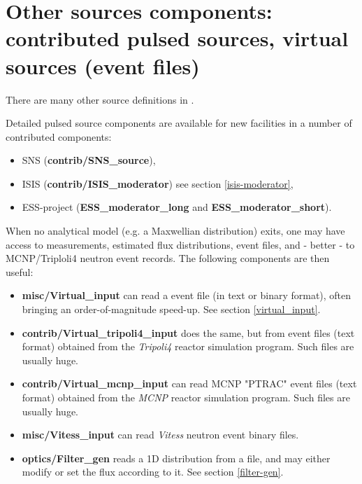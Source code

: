 





\newpage




\newpage




\newpage




\newpage
\section{Other sources components: contributed pulsed sources, virtual sources (event files)}
\label{sources-seealso}

There are many other source definitions in \MCS .

Detailed pulsed source components are available for new facilities
in a number of contributed components:
\begin{itemize}
\item SNS (\textbf{contrib/SNS\_source}),
\item ISIS (\textbf{contrib/ISIS\_moderator}) see section \ref{isis-moderator},
\item ESS-project (\textbf{ESS\_moderator\_long} and \textbf{ ESS\_moderator\_short}).
\end{itemize}

When no analytical model (e.g. a Maxwellian distribution) exits,
one may have access to measurements, estimated flux distributions,
event files, and - better - to MCNP/Triploli4 neutron event records.
The following components are then useful:

\begin{itemize}
\item{\textbf{misc/Virtual\_input} can read a \MCS event file
(in text or binary format), often bringing an order-of-magnitude speed-up.
See section \ref{virtual_input}.}
\item{\textbf{contrib/Virtual\_tripoli4\_input} does the same, but from event files (text format) obtained from the \emph{Tripoli4} \cite{tripoli_webpage} reactor simulation program. Such files are usually huge.}
\item{\textbf{contrib/Virtual\_mcnp\_input} can read MCNP "PTRAC" event files (text format) obtained from the \emph{MCNP} \cite{mcnp_webpage} reactor simulation program. Such files are usually huge.}
\item{\textbf{misc/Vitess\_input} can read \emph{Vitess} \cite{vitess_webpage} neutron event binary files.}
\item{\textbf{optics/Filter\_gen} reads a 1D distribution from a file, and may either modify or set the flux according to it. See section \ref{filter-gen}.}
\end{itemize}
